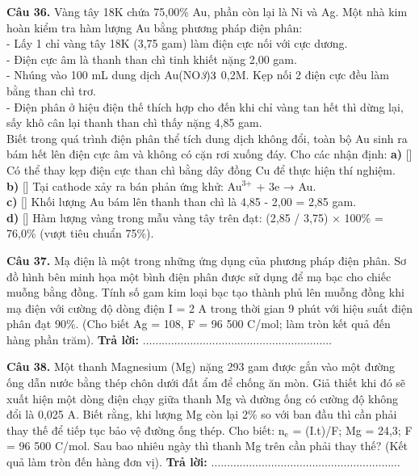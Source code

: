 \documentclass{article}
\begin{document}
\fontsize{22}{29}\selectfont
\textbf{Câu 36.} Vàng tây 18K chứa 75,00\% Au, phần còn lại là Ni và Ag. Một nhà kim hoàn kiểm tra hàm lượng Au bằng phương pháp điện phân:\\ 
- Lấy 1 chỉ vàng tây 18K (3,75 gam) làm điện cực nối với cực dương.\\ 
- Điện cực âm là thanh than chì tinh khiết nặng 2,00 gam.\\ 
- Nhúng vào 100 mL dung dịch Au(NO$\textit{{\text{3}}$)$}{\text{3}}$ 0,2M. Kẹp nối 2 điện cực đều làm bằng than chì trơ.\\ 
- Điện phân ở hiệu điện thế thích hợp cho đến khi chỉ vàng tan hết thì dừng lại, sấy khô cân lại thanh than chì thấy nặng 4,85 gam.\\ 
Biết trong quá trình điện phân thể tích dung dịch không đổi, toàn bộ Au sinh ra bám hết lên điện cực âm và không có cặn rơi xuống đáy. Cho các nhận định:
\vspace{6pt}
\textbf{a)} [\quad] Có thể thay kẹp điện cực than chì bằng dây đồng Cu để thực hiện thí nghiệm.\\[4pt]
\textbf{b)} [\quad] Tại cathode xảy ra bán phản ứng khử: Au$^{\text{3+}}$ + 3e → Au.\\[4pt]
\textbf{c)} [\quad] Khối lượng Au bám lên thanh than chì là 4,85 - 2,00 = 2,85 gam.\\[4pt]
\textbf{d)} [\quad] Hàm lượng vàng trong mẫu vàng tây trên đạt: (2,85 / 3,75) × 100\% = 76,0\% (vượt tiêu chuẩn 75\%).\\[4pt]
\vspace*{\fill}
\newpage

\fontsize{24}{32}\selectfont
\textbf{Câu 37.} Mạ điện là một trong những ứng dụng của phương pháp điện phân. Sơ đồ hình bên minh họa một bình điện phân được sử dụng để mạ bạc cho chiếc muỗng bằng đồng. Tính số gam kim loại bạc tạo thành phủ lên muỗng đồng khi mạ điện với cường độ dòng điện I = 2 A trong thời gian 9 phút với hiệu suất điện phân đạt 90\%. (Cho biết Ag = 108, F = 96 500 C/mol; làm tròn kết quả đến hàng phần trăm).
\vspace{12pt}
\textbf{Trả lời:} $\dots\dots\dots\dots\dots\dots\dots\dots\dots\dots\dots\dots\dots\dots\dots\dots\dots\dots\dots\dots$
\vspace*{\fill}
\newpage

\fontsize{24}{32}\selectfont
\textbf{Câu 38.} Một thanh Magnesium (Mg) nặng 293 gam được gắn vào một đường ống dẫn nước bằng thép chôn dưới đất ẩm để chống ăn mòn. Giả thiết khi đó sẽ xuất hiện một dòng điện chạy giữa thanh Mg và đường ống có cường độ không đổi là 0,025 A. Biết rằng, khi lượng Mg còn lại 2\% so với ban đầu thì cần phải thay thế để tiếp tục bảo vệ đường ống thép. Cho biết: n$_{\text{e}}$ = (I.t)/F; Mg = 24,3; F = 96 500 C/mol. Sau bao nhiêu ngày thì thanh Mg trên cần phải thay thế? (Kết quả làm tròn đến hàng đơn vị).
\vspace{12pt}
\textbf{Trả lời:} $\dots\dots\dots\dots\dots\dots\dots\dots\dots\dots\dots\dots\dots\dots\dots\dots\dots\dots\dots\dots$
\vspace*{\fill}
\newpage
\end{document}
